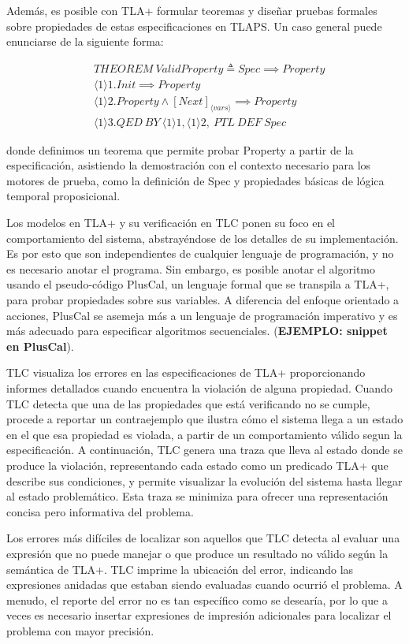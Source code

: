 \documentclass[runningheads]{llncs}
\begin{document}
Además, es posible con TLA+ formular teoremas y diseñar pruebas formales sobre propiedades de estas especificaciones en TLAPS. Un caso general puede enunciarse de la siguiente forma:
\begin{footnotesize}
\[
\begin{aligned}
    & THEOREM\ ValidProperty \triangleq Spec \implies Property \\
    & \langle 1 \rangle1. Init \implies Property \\
    & \langle 1 \rangle2. Property \land [Next]_{\langle vars \rangle} \implies Property \\
    & \langle 1 \rangle3. QED\ BY\ \langle 1 \rangle1, \langle 1 \rangle2,\ PTL\ DEF\ Spec
\end{aligned}
\]
\end{footnotesize}
donde definimos un teorema que permite probar Property a partir de la especificación, asistiendo la demostración con el contexto necesario para los motores de prueba, como la definición de Spec y propiedades básicas de lógica temporal proposicional.

Los modelos en TLA+ y su verificación en TLC ponen su foco en el comportamiento del sistema, abstrayéndose de los detalles de su implementación. Es por esto que son independientes de cualquier lenguaje de programación, y no es necesario anotar el programa. Sin embargo, es posible anotar el algoritmo usando el pseudo-código PlusCal, un lenguaje formal que se transpila a TLA+, para probar propiedades sobre sus variables. A diferencia del enfoque orientado a acciones, PlusCal se asemeja más a un lenguaje de programación imperativo y es más adecuado para especificar algoritmos secuenciales. (\textbf{EJEMPLO: snippet en PlusCal}).

TLC visualiza los errores en las especificaciones de TLA+ proporcionando informes detallados cuando encuentra la violación de alguna propiedad. Cuando TLC detecta que una de las propiedades que está verificando no se cumple, procede a reportar un contraejemplo que ilustra cómo el sistema llega a un estado en el que esa propiedad es violada, a partir de un comportamiento válido segun la especificación. A continuación, TLC genera una traza que lleva al estado donde se produce la violación, representando cada estado como un predicado TLA+ que describe sus condiciones, y permite visualizar la evolución del sistema hasta llegar al estado problemático. Esta traza se minimiza para ofrecer una representación concisa pero informativa del problema. 

Los errores más difíciles de localizar son aquellos que TLC detecta al evaluar una expresión que no puede manejar o que produce un resultado no válido según la semántica de TLA+. TLC imprime la ubicación del error, indicando las expresiones anidadas que estaban siendo evaluadas cuando ocurrió el problema. A menudo, el reporte del error no es tan específico como se desearía, por lo que a veces es necesario insertar expresiones de impresión adicionales para localizar el problema con mayor precisión.
\end{document}
